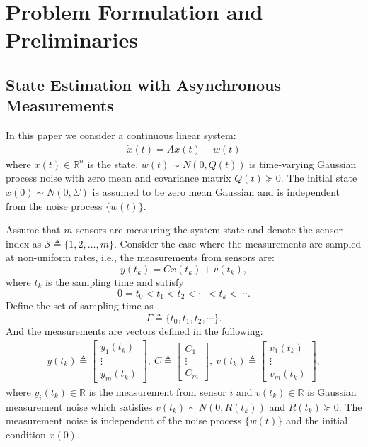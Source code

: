 \documentclass[12pt]{article}
\newcommand{\Rb}{{\mathbb{R}}}
\newcommand{\Ss}{{\mathscr{S}}}
\begin{document}
\section{Problem Formulation and Preliminaries}
\label{sec:problem}	
\subsection{State Estimation with Asynchronous Measurements}\label{sec:basic_measure}
In this paper we consider a continuous linear system:
\begin{align}\label{eq:system}
\dot{x}(t)=A x(t)+w(t)
\end{align}
where $x(t) \in \mathbb{R}^{n}$ is the state, $w(t) \sim {N}({0}, Q(t))$ is time-varying Gaussian process noise with zero mean and covariance matrix $Q(t)\succeq 0 .$ The initial state $x(0) \sim {N}(0, \Sigma)$ is assumed to be zero mean Gaussian and is independent from the noise process $\{w(t)\}$.

Assume that $m$ sensors are measuring the system state and denote the sensor index as $\Ss \triangleq\{1,2, \ldots, m\}$. 
Consider the case where the measurements are sampled at non-uniform rates, i.e., the measurements from sensors are:
\begin{equation}\label{eq:y_i_def}
y(t_k)=C x(t_k)+v(t_k), %
\end{equation}
where $t_k$ is the sampling time and satisfy
\begin{equation*}
	0=t_0<t_1<t_2 <\cdots < t_k < \cdots .
\end{equation*} 
Define the set of sampling time as 
\begin{equation*}
\Gamma \triangleq \{t_0,t_1,t_2,\cdots\} .
\end{equation*}
And the measurements are vectors defined in the following:
\begin{align}
	y(t_k) \triangleq\begin{bmatrix}
		y_{1}(t_k) \\
		\vdots \\
		y_{m}(t_k)
	\end{bmatrix}  ,\
	C \triangleq\begin{bmatrix}
		C_{1} \\
		\vdots \\
		C_{m}
	\end{bmatrix} , \
	v(t_k) \triangleq\begin{bmatrix}
		v_{1}(t_k) \\
		\vdots \\
		v_{m}(t_k)
	\end{bmatrix},
\end{align}
where $y_i(t_k) \in \mathbb{R}$ is the measurement from sensor $i$ and $v(t_k) \in \mathbb{R}$ is Gaussian measurement noise which satisfies $v(t_k)\sim N({0},R(t_k))$ and $R(t_k)\succeq 0$. The measurement noise is independent of the noise process $\{w(t)\}$ and the initial condition $x(0)$. 
\end{document}
